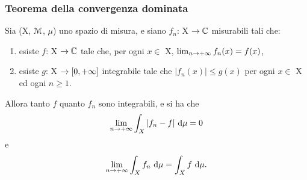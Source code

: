 \documentclass[Completo.tex]{subfiles}
\begin{document}
\subsubsection{Teorema della convergenza dominata}
\begin{eTh}
	Sia (X, $\eu[M]$, $\mu$) uno spazio di misura, e siano $f_n$: X $\ra \bb[C]$ misurabili tali che:
	\begin{enumerate}
		\item esiste $f$: X $\ra \bb[C]$ tale che, per ogni $x \in$ X, $\lim_{n \rightarrow +\infty} f_n(x) = f(x)$,
		\item esiste $g$: X $\rightarrow [0, +\infty]$ integrabile tale che $\vert f_n(x) \vert \leq g(x)$ per ogni $x \in$ X ed ogni $n\geq1$.
	\end{enumerate}
Allora tanto $f$ quanto $f_n$ sono integrabili, e si ha che
\begin{equation*}
	\lim_{n \rightarrow +\infty} \int_X \vert f_n - f \vert \ \mathrm{d}\mu = 0
\end{equation*}
e
\begin{equation*}
\lim_{n \rightarrow +\infty} \int_X f_n \ \mathrm{d}\mu = \int_X f \ \mathrm{d}\mu.
\end{equation*}
\end{eTh}
\end{document}
